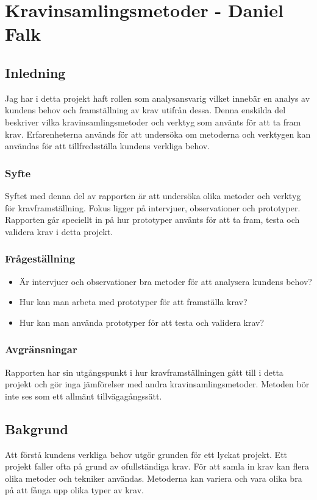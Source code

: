 \section{Kravinsamlingsmetoder - Daniel Falk}
\subsection{Inledning}
Jag har i detta projekt haft rollen som analysansvarig vilket innebär en analys av kundens behov och framställning av krav utifrån dessa. Denna enskilda del beskriver vilka kravinsamlingsmetoder och verktyg som använts för att ta fram krav. Erfarenheterna används för att undersöka om metoderna och verktygen kan användas för att tillfredsställa kundens verkliga behov.
\subsubsection{Syfte}
Syftet med denna del av rapporten är att undersöka olika metoder och verktyg för kravframställning. Fokus ligger på intervjuer, observationer och prototyper. Rapporten går speciellt in på hur prototyper använts för att ta fram, testa och validera krav i detta projekt.
\subsubsection{Frågeställning}
\begin{itemize}
\item Är intervjuer och observationer bra metoder för att analysera kundens behov?
\item Hur kan man arbeta med prototyper för att framställa krav?
\item Hur kan man använda prototyper för att testa och validera krav?
\end{itemize}
\subsubsection{Avgränsningar}
Rapporten har sin utgångspunkt i hur kravframställningen gått till i detta projekt och gör inga jämförelser med andra kravinsamlingsmetoder. Metoden bör inte ses som ett allmänt tillvägagångssätt.
\subsection{Bakgrund}
Att förstå kundens verkliga behov utgör grunden för ett lyckat projekt. Ett projekt faller ofta på grund av ofullständiga krav\cite{Hull}.
För att samla in krav kan flera olika metoder och tekniker användas. Metoderna kan variera och vara olika bra på att fånga upp olika typer av krav.
